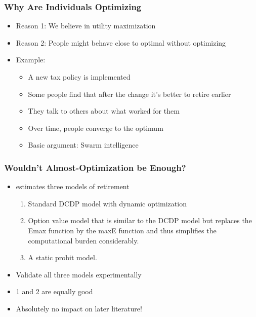 \documentclass[11pt]{beamer}
\begin{document}
\begin{frame}[c]\frametitle{Why Are Individuals Optimizing}
    \begin{itemize}
        \item Reason 1: We believe in utility maximization
        \item Reason 2: People might behave close to optimal without optimizing
        \item Example:
            \begin{itemize}
                \item A new tax policy is implemented
                \item Some people find that after the change it's better to retire earlier
                \item They talk to others about what worked for them
                \item Over time, people converge to the optimum
                \item Basic argument: Swarm intelligence
            \end{itemize}
    \end{itemize}
\end{frame}


\begin{frame}[c]\frametitle{Wouldn't Almost-Optimization be Enough?}
    \begin{itemize}
        \item \cite{Lumsdaine1990} estimates three models of retirement
        \begin{enumerate}
            \item Standard DCDP model with dynamic optimization
            \item Option value model that is similar to the DCDP model but replaces the Emax function by the maxE function and thus simplifies the computational burden considerably.
            \item A static probit model.
        \end{enumerate}
        \item Validate all three models experimentally
        \item 1 and 2 are equally good
        \item Absolutely no impact on later literature!
    \end{itemize}
\end{frame}
\end{document}
